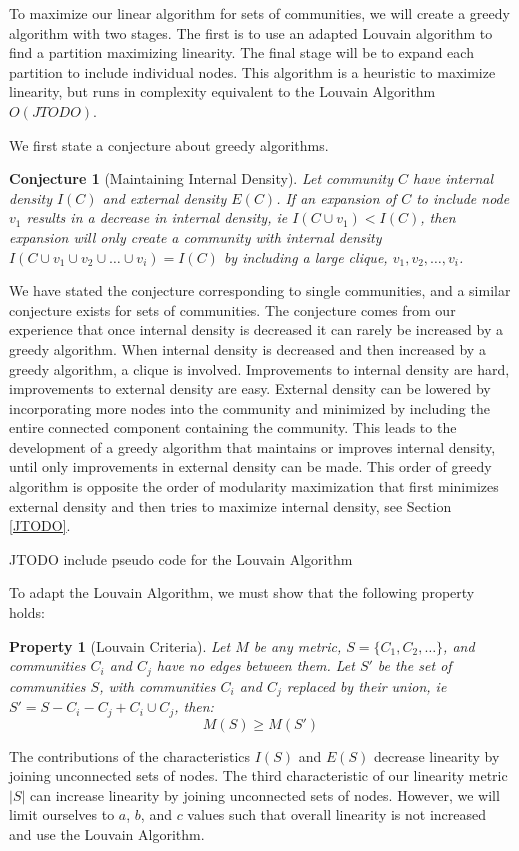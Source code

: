 \documentclass[phd,tocprelim]{cornell}
\newtheorem{conjecture}[definition]{Conjecture}
\newtheorem{property}[definition]{Property}
\begin{document}
To maximize our linear algorithm for sets of communities, we will create a greedy algorithm with two stages.  The first is to use an adapted Louvain algorithm \cite{blondel} to find a partition maximizing linearity.  The final stage will be to expand each partition to include individual nodes.  This algorithm is a heuristic to maximize linearity, but runs in complexity equivalent to the Louvain Algorithm $O(JTODO)$.

We first state a conjecture about greedy algorithms.
\begin{conjecture}[Maintaining Internal Density]
Let community $C$ have internal density $I(C)$ and external density $E(C)$.  If an expansion of $C$ to include node $v_1$ results in a decrease in internal density, ie $I(C \cup v_1) < I(C)$, then expansion will only create a community with internal density $I(C \cup v_1 \cup v_2 \cup \dots \cup v_i) = I(C)$ by including a large clique, $v_1, v_2, \dots, v_i$.
\label{conj:int_density}
\end{conjecture}
We have stated the conjecture corresponding to single communities, and a similar conjecture exists for sets of communities.  The conjecture comes from our experience that once internal density is decreased it can rarely be increased by a greedy algorithm.  When internal density is decreased and then increased by a greedy algorithm, a clique is involved.  Improvements to internal density are hard, improvements to external density are easy.  External density can be lowered by incorporating more nodes into the community and minimized by including the entire connected component containing the community. This leads to the development of a greedy algorithm that maintains or improves internal density, until only improvements in external density can be made.  This order of greedy algorithm is opposite the order of modularity maximization that first minimizes external density and then tries to maximize internal density, see Section \ref{JTODO}.

JTODO include pseudo code for the Louvain Algorithm

To adapt the Louvain Algorithm, we must show that the following property holds:
\begin{property}[Louvain Criteria]
Let $M$ be any metric, $S = \{C_1, C_2, \dots \}$, and communities $C_i$ and $C_j$ have no edges between them.  Let $S'$ be the set of communities $S$, with communities $C_i$ and $C_j$ replaced by their union, ie $S' = S - C_i - C_j + C_i \cup C_j$, then:
\begin{equation}
M(S) \geq M(S')
\end{equation}
\end{property}
The contributions of the characteristics $I(S)$ and $E(S)$ decrease linearity by joining unconnected sets of nodes.  The third characteristic of our linearity metric $|S|$ can increase linearity by joining unconnected sets of nodes.  However, we will limit ourselves to $a$, $b$, and $c$ values such that overall linearity is not increased and use the Louvain Algorithm.
\end{document}
